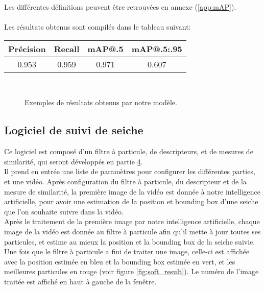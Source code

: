 Les différentes définitions peuvent être retrouvées en annexe (\ref{app:mAP}).\\
\\
Les résultats obtenus sont compilés dans le tableau suivant:\\
\begin{center}
\begin{tabular}{|c|c|c|c|}
	\hline
	Précision & Recall & mAP@.5 & mAP@.5:.95\\
	\hline
	0.953 & 0.959 & 0.971 & 0.607\\
	\hline
\end{tabular}
\end{center}

\begin{figure}[!htbp]
\center
	\hspace{0.1cm}
	\\
	\hspace{0.1cm}
\caption{Exemples de résultats obtenus par notre modèle.}
\label{fig:ai_examples}
\end{figure}
\FloatBarrier



\subsection{Logiciel de suivi de seiche}
Ce logiciel est composé d'un filtre à particule, de descripteurs, et de mesures de similarité, qui seront développés en partie \hyperlink{chapter.4}{4}.\\
Il prend en entrée une liste de paramètres pour configurer les différentes parties, et une vidéo. Après configuration du filtre à particule, du descripteur et de la mesure de similarité, la première image de la vidéo est donnée à notre intelligence artificielle, pour avoir une estimation de la position et bounding box d'une seiche que l'on souhaite suivre dans la vidéo.\\
Après le traitement de la première image par notre intelligence artificielle, chaque image de la vidéo est donnée au filtre à particule afin qu'il mette à jour toutes ses particules, et estime au mieux la position et la bounding box de la seiche suivie.\\
Une fois que le filtre à particule a fini de traiter une image, celle-ci est affichée avec la position estimée en bleu et la bounding box estimée en vert, et les meilleures particules en rouge (voir figure \ref{fig:soft_result}). Le numéro de l'image traitée est affiché en haut à gauche de la fenêtre.\\

